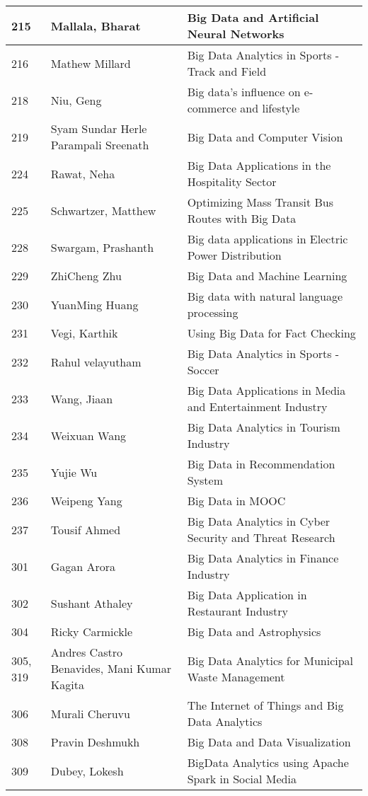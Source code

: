 \documentclass[12pt]{book}
\begin{document}
\begin{footnotesize}
\begin{longtable}{|p{1cm}p{5cm}p{9cm}|}
215 & Mallala, Bharat & Big Data and Artificial Neural Networks  \\
\hline
216 & Mathew Millard & Big Data Analytics in Sports - Track and Field  \\
\hline
218 & Niu, Geng & Big data's influence on e-commerce and lifestyle  \\
\hline
219 & Syam Sundar Herle Parampali Sreenath & Big Data and Computer Vision  \\
\hline
224 & Rawat, Neha & Big Data Applications in the Hospitality Sector  \\
\hline
225 & Schwartzer, Matthew & Optimizing Mass Transit Bus Routes with Big Data  \\
\hline
228 & Swargam, Prashanth & Big data applications in Electric Power Distribution  \\
\hline
229 & ZhiCheng Zhu & Big Data and Machine Learning  \\
\hline
230 & YuanMing Huang & Big data with natural language processing  \\
\hline
231 & Vegi, Karthik & Using Big Data for Fact Checking  \\
\hline
232 & Rahul velayutham & Big Data Analytics in Sports - Soccer  \\
\hline
233 & Wang, Jiaan & Big Data Applications in Media and Entertainment Industry  \\
\hline
234 & Weixuan Wang & Big Data Analytics in Tourism Industry  \\
\hline
235 & Yujie Wu & Big Data in Recommendation System  \\
\hline
236 & Weipeng Yang & Big Data in MOOC  \\
\hline
237 & Tousif Ahmed & Big Data Analytics in Cyber Security and Threat Research  \\
\hline
301 & Gagan Arora & Big Data Analytics in Finance Industry  \\
\hline
302 & Sushant Athaley & Big Data Application in Restaurant Industry  \\
\hline
304 & Ricky Carmickle & Big Data and Astrophysics  \\
\hline
305, 319 & Andres Castro Benavides, Mani Kumar Kagita & Big Data Analytics for Municipal Waste Management  \\
\hline
306 & Murali Cheruvu & The Internet of Things and Big Data Analytics  \\
\hline
308 & Pravin Deshmukh & Big Data and Data Visualization  \\
\hline
309 & Dubey, Lokesh & BigData Analytics using Apache Spark in Social Media  \\

\end{longtable}
\end{footnotesize}
\end{document}

